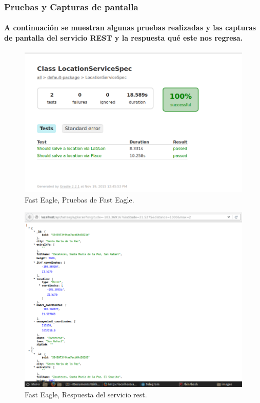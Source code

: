   \subsubsection{Pruebas y Capturas de pantalla}
      \paragraph{A continuación se muestran algunas pruebas realizadas y las capturas de pantalla del servicio REST y la respuesta qué este nos regresa.}
      \begin{figure}[h!]
        \centering
          \includegraphics[width=\textwidth]{./images/PruebasFastEagle}
          \caption{Fast Eagle, Pruebas de Fast Eagle.}
      \end{figure}
      \begin{figure}[h!]
        \centering
          \includegraphics[width=\textwidth]{./images/CapturaFastEagle}
          \caption{Fast Eagle, Respuesta del servicio rest.}
      \end{figure}